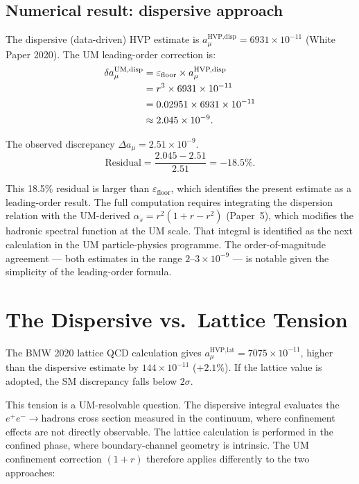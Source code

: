 \documentclass[12pt]{article}
\begin{document}
\subsection{Numerical result: dispersive approach}

The dispersive (data-driven) HVP estimate is
$a_\mu^{\text{HVP,disp}} = 6931 \times 10^{-11}$ (White Paper 2020).
The UM leading-order correction is:
\begin{align}
  \delta a_\mu^{\text{UM,disp}}
  &= \varepsilon_{\text{floor}} \times a_\mu^{\text{HVP,disp}} \notag\\
  &= r^3 \times 6931 \times 10^{-11} \notag\\
  &= 0.02951 \times 6931 \times 10^{-11} \notag\\
  &\approx 2.045 \times 10^{-9}.
  \label{eq:um_disp}
\end{align}

The observed discrepancy $\Delta a_\mu = 2.51 \times 10^{-9}$.
\begin{equation}
  \text{Residual}
  = \frac{2.045 - 2.51}{2.51} = -18.5\%.
  \label{eq:resid_disp}
\end{equation}

This 18.5\% residual is larger than $\varepsilon_{\text{floor}}$, which
identifies the present estimate as a leading-order result. The full
computation requires integrating the dispersion relation with the
UM-derived $\alpha_s = r^2(1 + r - r^2)$ (Paper~5), which modifies the
hadronic spectral function at the UM scale. That integral is identified
as the next calculation in the UM particle-physics programme. The
order-of-magnitude agreement --- both estimates in the range
$2\text{--}3 \times 10^{-9}$ --- is notable given the simplicity of the
leading-order formula.

\section{The Dispersive vs.\ Lattice Tension}

The BMW 2020 lattice QCD calculation gives
$a_\mu^{\text{HVP,lat}} = 7075 \times 10^{-11}$, higher than the
dispersive estimate by $144 \times 10^{-11}$ ($+2.1\%$). If the lattice
value is adopted, the SM discrepancy falls below $2\sigma$.

This tension is a UM-resolvable question. The dispersive integral
evaluates the $e^+e^- \to \text{hadrons}$ cross section measured in
the continuum, where confinement effects are not directly observable.
The lattice calculation is performed in the confined phase, where
boundary-channel geometry is intrinsic. The UM confinement correction
$(1+r)$ therefore applies differently to the two approaches:
\end{document}
